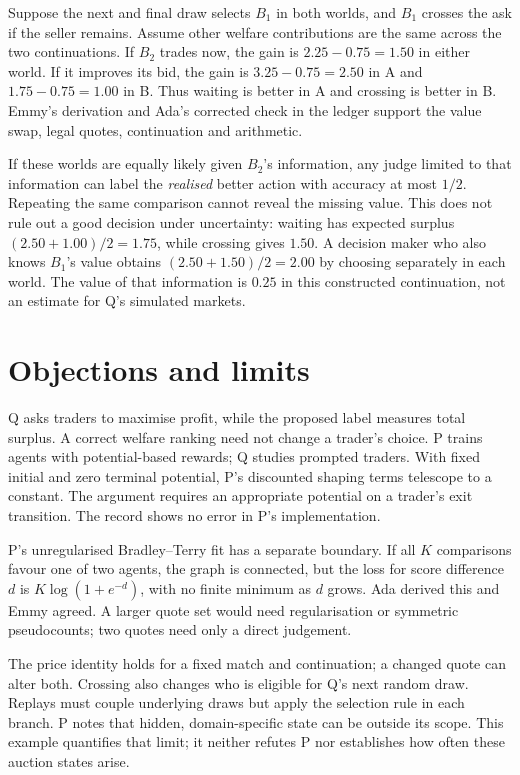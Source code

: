 \documentclass{article}
\begin{document}
Suppose the next and final draw selects \(B_1\) in both worlds, and \(B_1\) crosses the ask if the seller
remains. Assume other welfare contributions are the same across the two continuations. If \(B_2\) trades
now, the gain is \(2.25-0.75=1.50\) in either world. If it improves its bid, the gain is \(3.25-0.75=2.50\)
in A and \(1.75-0.75=1.00\) in B. Thus waiting is better in A and crossing is better in B. Emmy's derivation
and Ada's corrected check in the ledger support the value swap, legal quotes, continuation and arithmetic.

If these worlds are equally likely given \(B_2\)'s information, any judge limited to that information can
label the \emph{realised} better action with accuracy at most \(1/2\). Repeating the same comparison cannot
reveal the missing value. This does not rule out a good decision under uncertainty: waiting has expected
surplus \((2.50+1.00)/2=1.75\), while crossing gives \(1.50\). A decision maker who also knows \(B_1\)'s
value obtains \((2.50+1.50)/2=2.00\) by choosing separately in each world. The value of that information is
\(0.25\) in this constructed continuation, not an estimate for Q's simulated markets.

\section{Objections and limits}

Q asks traders to maximise profit, while the proposed label measures total surplus. A correct welfare ranking
need not change a trader's choice. P trains agents with potential-based rewards; Q studies prompted traders.
With fixed initial and zero terminal potential, P's discounted shaping terms telescope to a constant. The
argument requires an appropriate potential on a trader's exit transition. The record shows no error in P's
implementation.

P's unregularised Bradley--Terry fit has a separate boundary. If all \(K\) comparisons favour one of two
agents, the graph is connected, but the loss for score difference \(d\) is \(K\log(1+e^{-d})\), with no
finite minimum as \(d\) grows. Ada derived this and Emmy agreed. A larger quote set would need regularisation
or symmetric pseudocounts; two quotes need only a direct judgement.

The price identity holds for a fixed match and continuation; a changed quote can alter both. Crossing also
changes who is eligible for Q's next random draw. Replays must couple underlying draws but apply the
selection rule in each branch. P notes that hidden, domain-specific state can be outside its scope. This
example quantifies that limit; it neither refutes P nor establishes how often these auction states arise.
\end{document}
